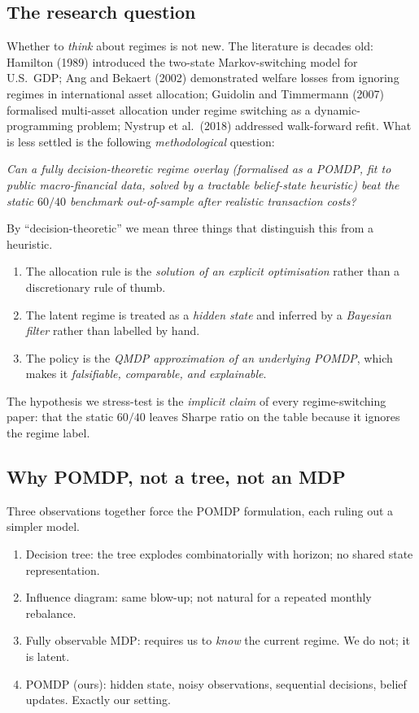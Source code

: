 \documentclass[11pt]{article}
\theoremstyle{plain1}
\theoremstyle{definition1}
\newcommand{\1}{\mathbf{1}}
\begin{document}
\subsection{The research question}

Whether to \emph{think} about regimes is not new. The literature is decades old: Hamilton (1989) introduced the two-state Markov-switching model for U.S.\ GDP; Ang and Bekaert (2002) demonstrated welfare losses from ignoring regimes in international asset allocation; Guidolin and Timmermann (2007) formalised multi-asset allocation under regime switching as a dynamic-programming problem; Nystrup et al.\ (2018) addressed walk-forward refit. What is less settled is the following \emph{methodological} question:
\begin{center}\itshape
Can a fully decision-theoretic regime overlay (formalised as a POMDP, fit to public macro-financial data, solved by a tractable belief-state heuristic) beat the static $60/40$ benchmark out-of-sample after realistic transaction costs?
\end{center}

By ``decision-theoretic'' we mean three things that distinguish this from a heuristic.
\begin{enumerate}[leftmargin=2em]
  \item The allocation rule is the \emph{solution of an explicit optimisation} rather than a discretionary rule of thumb.
  \item The latent regime is treated as a \emph{hidden state} and inferred by a \emph{Bayesian filter} rather than labelled by hand.
  \item The policy is the \emph{QMDP approximation of an underlying POMDP}, which makes it \emph{falsifiable, comparable, and explainable}.
\end{enumerate}
The hypothesis we stress-test is the \emph{implicit claim} of every regime-switching paper: that the static $60/40$ leaves Sharpe ratio on the table because it ignores the regime label.

\subsection{Why POMDP, not a tree, not an MDP}

Three observations together force the POMDP formulation, each ruling out a simpler model.
\begin{enumerate}[leftmargin=2em]
  \item Decision tree: the tree explodes combinatorially with horizon; no shared state representation.
  \item Influence diagram: same blow-up; not natural for a repeated monthly rebalance.
  \item Fully observable MDP: requires us to \emph{know} the current regime. We do not; it is latent.
  \item POMDP (ours): hidden state, noisy observations, sequential decisions, belief updates. Exactly our setting.
\end{enumerate}
\end{document}

